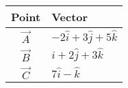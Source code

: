 \begin{tabular}{|c|p{3cm}|}
    \hline
    \textbf{Point} &\textbf{Vector} \\
    \hline
         $\vec{A}$ & $-2\hat{i}+3\hat{j}+5\hat{k}$  \\
    \hline
        $\vec{B}$ & $\hat{i}+2\hat{j}+3\hat{k}$ \\
    \hline
        $\vec{C}$ & $7\hat{i}-\hat{k}$ \\
    \hline
\end{tabular}
